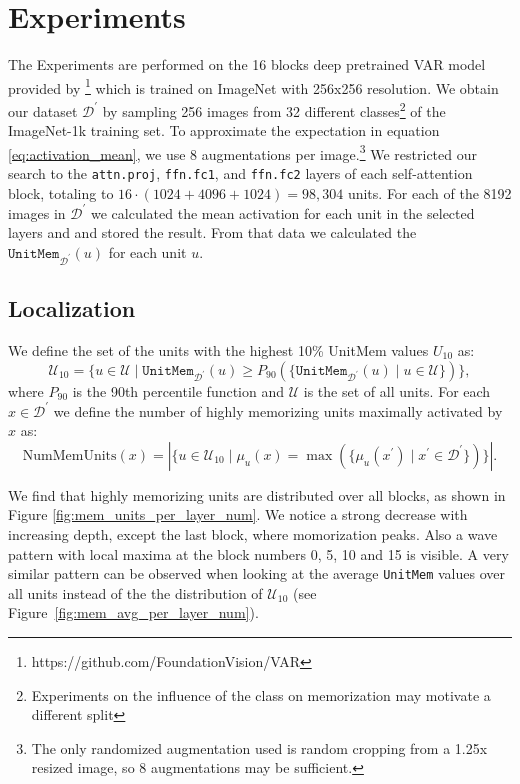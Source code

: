 \documentclass{article} %
\begin{document}
\section{Experiments}
The Experiments are performed on the 16 blocks deep pretrained VAR model provided by \citet{tianVisualAutoregressiveModeling2024}\footnote{https://github.com/FoundationVision/VAR} which is trained on ImageNet with 256x256 resolution.
We obtain our dataset $\mathcal{D}^\prime$ by sampling 256 images from 32 different classes\footnote{Experiments on the influence of the class on memorization may motivate a different split} of the ImageNet-1k training set.
To approximate the expectation in equation \ref{eq:activation_mean}, we use 8 augmentations per image.\footnote{The only randomized augmentation used is random cropping from a 1.25x resized image, so 8 augmentations may be sufficient.}
We restricted our search to the \texttt{attn.proj}, \texttt{ffn.fc1}, and \texttt{ffn.fc2} layers of each self-attention block, totaling to $16\cdot (1024 + 4096 + 1024) = 98,304$ units.
For each of the 8192 images in $\mathcal{D}^\prime$ we calculated the mean activation for each unit in the selected layers and and stored the result.
From that data we calculated the $\texttt{UnitMem}_{\mathcal{D}^\prime}(u)$ for each unit $u$.
\subsection{Localization}
We define the set of the units with the highest 10\% UnitMem values $U_{10}$ as:
\begin{equation}\label{eq:mem_units}
   \mathcal{U}_{10} = \{u \in \mathcal{U} \mid\texttt{UnitMem}_{\mathcal{D}^\prime}(u) \geq P_{90}(\{\texttt{UnitMem}_{\mathcal{D}^\prime}(u) \mid u \in \mathcal{U}\})\},
\end{equation}
where $P_{90}$ is the 90th percentile function and $\mathcal{U}$ is the set of all units.
For each $x \in \mathcal{D}^\prime$ we define the number of highly memorizing units maximally activated by $x$ as:
\[\text{NumMemUnits}(x) = |\{u \in \mathcal{U}_{10} \mid \mu_u(x) = \max(\{\mu_u(x^\prime) \mid x^\prime \in \mathcal{D}^\prime\})\}|.\]

We find that highly memorizing units are distributed over all blocks, as shown in Figure \ref{fig:mem_units_per_layer_num}.
We notice a strong decrease with increasing depth, except the last block, where momorization peaks.
Also a wave pattern with local maxima at the block numbers 0, 5, 10 and 15 is visible.
A very similar pattern can be observed when looking at the average \texttt{UnitMem} values over all units instead of the the distribution of $\mathcal{U}_{10}$ (see Figure~\ref{fig:mem_avg_per_layer_num}).
\end{document}
